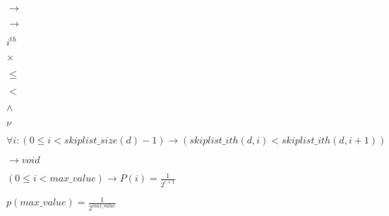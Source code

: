\documentclass{article}
\begin{document}
$\rightarrow$
\pagebreak

$\rightarrow $
\pagebreak

$i^{th}$
\pagebreak

$\times$
\pagebreak

$\le$
\pagebreak

$<$
\pagebreak

$\wedge$
\pagebreak

$\nu$
\pagebreak

$ \forall i : (0 \le i < skiplist\_size(d) - 1) \rightarrow (skiplist\_ith(d, i) < skiplist\_ith(d, i+1)) $
\pagebreak

$\rightarrow void$
\pagebreak

$ (0 \le i < max\_value) \rightarrow P(i) = \frac{1}{2^{i+1}} $
\pagebreak

$ p(max\_value) = \frac{1}{2^{max\_value}} $
\pagebreak
\end{document}
